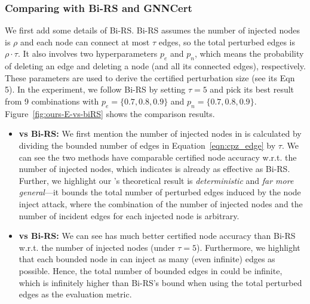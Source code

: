 \subsubsection{Comparing {\name} with Bi-RS and GNNCert}

We first add some details of Bi-RS.
Bi-RS assumes the number of injected nodes is $\rho$ and each node can connect at most $\tau$ edges, so the total perturbed edges is $\rho \cdot \tau$. It also involves two hyperparameters $p_e$ and $p_n$, which means the probability of deleting an edge and deleting a node (and all its connected edges), respectively. These parameters are used to derive the certified perturbation size (see its Eqn 5). 
In the experiment, we follow Bi-RS by setting $\tau=5$ and pick its best result from 9 combinations with $p_e=\{0.7,0.8,0.9\}$ and $p_n=\{0.7,0.8,0.9\}$. 
Figure~\ref{fig:ours-E-vs-biRS} shows the comparison results.


\begin{itemize}[leftmargin=*]
\vspace{-2mm}
\item {\bf {\nameE} vs Bi-RS:} 
We first mention the number of injected nodes in {\nameE} is calculated by dividing the bounded number of edges in Equation~\ref{eqn:cpz_edge} by $\tau$. We can see the two methods have comparable certified node accuracy w.r.t. the number of injected nodes, which indicates {\nameE} is already as effective as Bi-RS.  
Further, we highlight our {\nameE}'s theoretical result is \emph{deterministic} and \emph{far more general}---it bounds the total number of perturbed edges induced by the node inject attack, where the combination of the number of injected nodes and the number of incident edges for each injected node is arbitrary.  

\vspace{-2mm}
\item {\bf {\nameN} vs Bi-RS:} We can see {\nameN} has much better certified node accuracy than Bi-RS w.r.t. the number of injected nodes (under $\tau=5$). Furthermore, we highlight that each bounded node in {\nameN} can inject as many (even infinite) edges as possible. Hence, the total number of bounded edges in {\nameN} could be infinite, which is infinitely higher than Bi-RS's bound when using the total perturbed edges as the evaluation metric.  

\vspace{-2mm}
\end{itemize}







